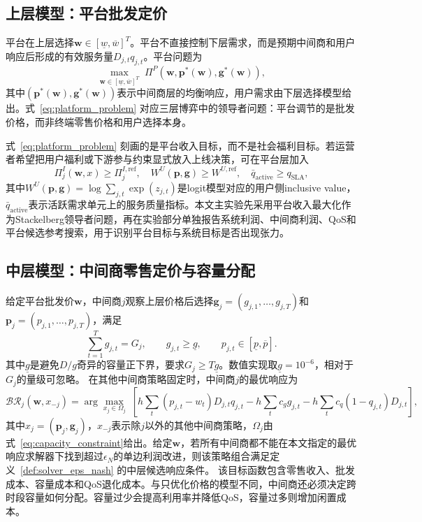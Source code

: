 \documentclass[UTF8,11pt]{ctexart}
\newcommand{\D}{D}
\newcommand{\w}{\boldsymbol{w}}
\newcommand{\p}{\boldsymbol{p}}
\newcommand{\g}{\boldsymbol{g}}
\begin{document}
\subsection{上层模型：平台批发定价}
\label{sec:upper_platform}

平台在上层选择$\w\in[\underline w,\overline w]^T$。平台不直接控制下层需求，而是预期中间商和用户响应后形成的有效服务量$\D_{j,t}q_{j,t}$。平台问题为
\begin{equation}
  \max_{\w\in[\underline w,\overline w]^T}\;
  \Pi^P(\w,\p^*(\w),\g^*(\w)),
  \label{eq:platform_problem}
\end{equation}
其中$(\p^*(\w),\g^*(\w))$表示中间商层的均衡响应，用户需求由下层选择模型给出。式~\eqref{eq:platform_problem} 对应三层博弈中的领导者问题：平台调节的是批发价格，而非终端零售价格和用户选择本身。

式~\eqref{eq:platform_problem} 刻画的是平台收入目标，而不是社会福利目标。若运营者希望把用户福利或下游参与约束显式放入上线决策，可在平台层加入
\begin{equation}
  \Pi^I_j(\w,x)\ge \Pi^{I,\mathrm{ref}}_j,\quad
  W^U(\p,\g)\ge W^{U,\mathrm{ref}},\quad
  \bar q_{\mathrm{active}}\ge q_{\mathrm{SLA}},
  \label{eq:deployment_constraints}
\end{equation}
其中$W^U(\p,\g)=\log\sum_{j,t}\exp(z_{j,t})$是logit模型对应的用户侧inclusive value，$\bar q_{\mathrm{active}}$表示活跃需求单元上的服务质量指标。本文主实验先采用平台收入最大化作为Stackelberg领导者问题，再在实验部分单独报告系统利润、中间商利润、QoS和平台候选参考搜索，用于识别平台目标与系统目标是否出现张力。

\subsection{中层模型：中间商零售定价与容量分配}
\label{sec:middle_intermediary}

给定平台批发价$\w$，中间商$j$观察上层价格后选择$\g_j=(g_{j,1},\ldots,g_{j,T})$和$\p_j=(p_{j,1},\ldots,p_{j,T})$，满足
\begin{equation}
  \sum_{t=1}^{T}g_{j,t}=G_j,\qquad g_{j,t}\ge \underline g,\qquad
  p_{j,t}\in[\underline p,\overline p].
  \label{eq:capacity_constraint}
\end{equation}
其中$\underline g$是避免$D/g$奇异的容量正下界，要求$G_j\ge T\underline g$。数值实现取$\underline g=10^{-6}$，相对于$G_j$的量级可忽略。
在其他中间商策略固定时，中间商$j$的最优响应为
\begin{equation}
  \mathcal{BR}_j(\w,x_{-j})=
  \arg\max_{x_j\in\Omega_j}\;
  \left[
  h\sum_{t}(p_{j,t}-w_t)\D_{j,t}q_{j,t}
  -h\sum_t c_g g_{j,t}
  -h\sum_t c_q(1-q_{j,t})\D_{j,t}
  \right],
  \label{eq:broker_problem}
\end{equation}
其中$x_j=(\p_j,\g_j)$，$x_{-j}$表示除$j$以外的其他中间商策略，$\Omega_j$由式~\eqref{eq:capacity_constraint}给出。给定$\w$，若所有中间商都不能在本文指定的最优响应求解器下找到超过$\epsilon_N$的单边利润改进，则该策略组合满足定义~\ref{def:solver_eps_nash} 的中层候选响应条件。
该目标函数包含零售收入、批发成本、容量成本和QoS退化成本。与只优化价格的模型不同，中间商还必须决定跨时段容量如何分配。容量过少会提高利用率并降低QoS，容量过多则增加闲置成本。
\end{document}

